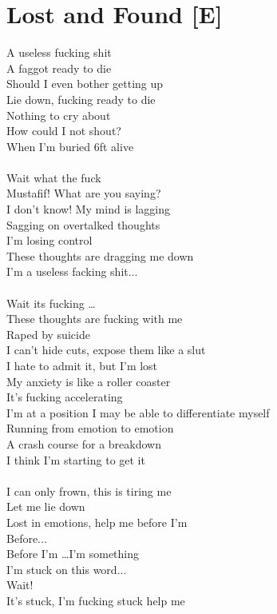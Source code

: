 \documentclass[12pt, b5paper, oneside]{book}
\begin{document}
\section{Lost and Found [E]}
A useless fucking shit
\\A faggot ready to die
\\Should I even bother getting up
\\Lie down, fucking ready to die
\\Nothing to cry about
\\How could I not shout?
\\When I'm buried 6ft alive
%
\\\\Wait what the fuck
\\Mustafif! What are you saying?
\\I don't know! My mind is lagging
\\Sagging on overtalked thoughts
\\I'm losing control
\\These thoughts are dragging me down
\\I'm a useless facking shit...
%
\\\\Wait its fucking \dots 
\\These thoughts are fucking with me
\\Raped by suicide
\\I can't hide cuts, expose them like a slut
\\I hate to admit it, but I'm lost
\\My anxiety is like a roller coaster
\\It's fucking accelerating
\\I'm at a position I may be able to differentiate myself
\\Running from emotion to emotion
\\A crash course for a breakdown
\\I think I'm starting to get it
%
\\\\I can only frown, this is tiring me
\\Let me lie down
\\Lost in emotions, help me before I'm
\\Before...
\\Before I'm \dots I'm something
\\I'm stuck on this word...
\\Wait!
\\It's stuck, I'm fucking stuck help me
\end{document}
